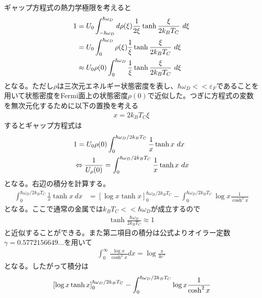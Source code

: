 \documentclass[dvipdfmx, 11pt, a4paper]{jsarticle}
\numberwithin{equation}{section}
\theoremstyle{definition}
\begin{document}
    \begin{derivationBox}
        ギャップ方程式の熱力学極限を考えると
        \begin{align}
            1  &=  U_0\int_{-\hbar \omega_D}^{\hbar \omega_D}d \rho(\xi)  \frac{1}{2\xi} \tanh \frac{ \xi}{2k_B T_C}\ d\xi \notag \\
            &= U_0\int_{0}^{\hbar \omega_D} \rho(\xi)  \frac{1}{\xi} \tanh \frac{ \xi}{2k_B T_C}\ d\xi \notag \\
            &\approx U_0\rho(0)\int_{0}^{\hbar \omega_D}   \frac{1}{\xi} \tanh \frac{ \xi}{2k_B T_C}\ d\xi
        \end{align}
        となる。ただし$\rho$は三次元エネルギー状態密度を表し、$\hbar \omega_D <<\varepsilon_F$であることを用いて状態密度をFermi面上の状態密度$\rho(0)$で近似した。つぎに方程式の変数を無次元化するために以下の置換を考える
        \begin{align}
            x = 2k_BT_C\xi
        \end{align}
        するとギャップ方程式は
        \begin{align}
            &1 = U_0 \rho(0) \int_0^{\hbar\omega_D / 2k_BT_C}  \frac{1}{x} \tanh x\ dx \notag \\
            &\Leftrightarrow \frac{1}{U_ \rho(0)} = \int_0^{\hbar\omega_D / 2k_BT_C}  \frac{1}{x} \tanh x\ dx
        \end{align}
        となる。右辺の積分を計算する。
        \begin{align}
            \int_0^{\hbar\omega_D / 2k_BT_C}  \frac{1}{x} \tanh x\ dx &= \left[ \log x \tanh x \right]_0^{\hbar\omega_D / 2k_BT_C} - \int_0^{\hbar\omega_D / 2k_BT_C} \log x \frac{1}{\cosh ^2x}
        \end{align}
        となる。ここで通常の金属では$k_B T_C << \hbar \omega_D$が成立するので
        \begin{align}
            \tanh \frac{\hbar\omega_D}{2k_BT_C} \approx 1
        \end{align}
        と近似することができる。また第二項目の積分は公式よりオイラー定数$\gamma = 0.5772156649...$を用いて
        \begin{align}
            \int_0^\infty \frac{\log x}{\cosh^2x} dx = \log \frac{\pi}{4e^\gamma}
        \end{align}
        となる。したがって積分は
        \begin{align}
            &\left[ \log x \tanh x \right]_0^{\hbar\omega_D / 2k_BT_C} - \int_0^{\hbar\omega_D / 2k_BT_C} \log x \frac{1}{\cosh ^2x} \notag \\

\end{align}
\end{derivationBox}
\end{document}
